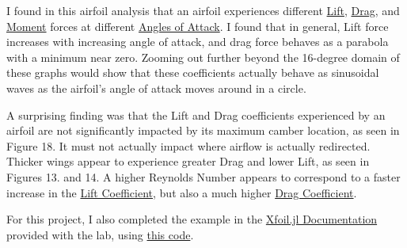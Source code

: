 \documentclass{article}
\begin{document}
I found in this airfoil analysis that an airfoil experiences different \hyperlink{CL}{Lift}, \hyperlink{CL}{Drag}, and \hyperlink{CM}{Moment} forces at different \hyperlink{alpha}{Angles of Attack}. I found that in general, Lift force increases with increasing angle of attack, and drag force behaves as a parabola with a minimum near zero. Zooming out further beyond the 16-degree domain of these graphs would show that these coefficients actually behave as sinusoidal waves as the airfoil's angle of attack moves around in a circle.\newline

A surprising finding was that the Lift and Drag coefficients experienced by an airfoil are not significantly impacted by its maximum camber location, as seen in Figure 18. It must not actually impact where airflow is actually redirected. Thicker wings appear to experience greater Drag and lower Lift, as seen in Figures 13. and 14. A higher Reynolds Number appears to correspond to a faster increase in the \hyperlink{CL}{Lift Coefficient}, but also a much higher \hyperlink{CD}{Drag Coefficient}. \newline

For this project, I also completed the example in the \href{https://flow.byu.edu/Xfoil.jl/stable/}{Xfoil.jl Documentation} provided with the lab, using \href{https://github.com/JoeSpencer1/497R-Projects/blob/Airfoil-Analysis/Demo.jl}{this code}.

\clearpage
\end{document}
